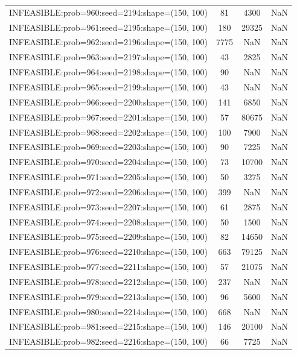 \begin{longtable}{lccc}
INFEASIBLE:prob=960:seed=2194:shape=(150, 100) &    81 &  4300 &    NaN \\
INFEASIBLE:prob=961:seed=2195:shape=(150, 100) &   180 & 29325 &    NaN \\
INFEASIBLE:prob=962:seed=2196:shape=(150, 100) &  7775 &   NaN &    NaN \\
INFEASIBLE:prob=963:seed=2197:shape=(150, 100) &    43 &  2825 &    NaN \\
INFEASIBLE:prob=964:seed=2198:shape=(150, 100) &    90 &   NaN &    NaN \\
INFEASIBLE:prob=965:seed=2199:shape=(150, 100) &    43 &   NaN &    NaN \\
INFEASIBLE:prob=966:seed=2200:shape=(150, 100) &   141 &  6850 &    NaN \\
INFEASIBLE:prob=967:seed=2201:shape=(150, 100) &    57 & 80675 &    NaN \\
INFEASIBLE:prob=968:seed=2202:shape=(150, 100) &   100 &  7900 &    NaN \\
INFEASIBLE:prob=969:seed=2203:shape=(150, 100) &    90 &  7225 &    NaN \\
INFEASIBLE:prob=970:seed=2204:shape=(150, 100) &    73 & 10700 &    NaN \\
INFEASIBLE:prob=971:seed=2205:shape=(150, 100) &    50 &  3275 &    NaN \\
INFEASIBLE:prob=972:seed=2206:shape=(150, 100) &   399 &   NaN &    NaN \\
INFEASIBLE:prob=973:seed=2207:shape=(150, 100) &    61 &  2875 &    NaN \\
INFEASIBLE:prob=974:seed=2208:shape=(150, 100) &    50 &  1500 &    NaN \\
INFEASIBLE:prob=975:seed=2209:shape=(150, 100) &    82 & 14650 &    NaN \\
INFEASIBLE:prob=976:seed=2210:shape=(150, 100) &   663 & 79125 &    NaN \\
INFEASIBLE:prob=977:seed=2211:shape=(150, 100) &    57 & 21075 &    NaN \\
INFEASIBLE:prob=978:seed=2212:shape=(150, 100) &   237 &   NaN &    NaN \\
INFEASIBLE:prob=979:seed=2213:shape=(150, 100) &    96 &  5600 &    NaN \\
INFEASIBLE:prob=980:seed=2214:shape=(150, 100) &   668 &   NaN &    NaN \\
INFEASIBLE:prob=981:seed=2215:shape=(150, 100) &   146 & 20100 &    NaN \\
INFEASIBLE:prob=982:seed=2216:shape=(150, 100) &    66 &  7725 &    NaN \\

\end{longtable}

